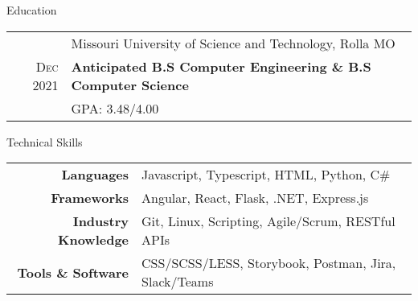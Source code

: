 \documentclass{resume}
\begin{document}
    
\begin{rSection}{Education}
    \small {
    \begin{tabular}{r|p{15cm}}
       & Missouri University of Science and Technology, Rolla MO  \\ 
      \textsc{Dec} 2021 & \textbf{Anticipated B.S Computer Engineering \& B.S Computer Science} \\
      & GPA: 3.48/4.00
    \end{tabular}
    }
\end{rSection}
      
\begin{rSection}{Technical Skills}
  \small
  {
      \begin{tabular}{rl}
      \multicolumn{1}{r|}{\textbf{Languages}} & Javascript, Typescript, HTML, Python, C\# \\
      \multicolumn{1}{r|}{\textbf{Frameworks}} & Angular, React, Flask, .NET, Express.js \\
      \multicolumn{1}{r|}{\textbf{Industry Knowledge}} & Git, Linux, Scripting, Agile/Scrum, RESTful APIs \\
      \multicolumn{1}{r|}{\textbf{Tools \& Software}} & CSS/SCSS/LESS, Storybook, Postman, Jira, Slack/Teams
      \end{tabular}
  }
\end{rSection}
\end{document}
